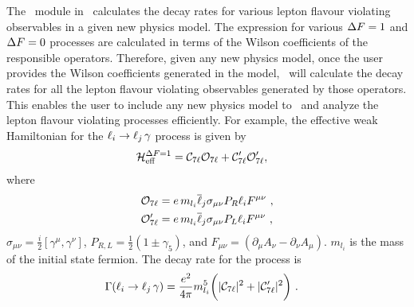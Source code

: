 \documentclass[preprint,3p,12pt]{elsarticle}
\begin{document}
The \lfv\ module in \hf\ calculates the decay rates for various lepton flavour violating observables in a given new physics model. The expression for various $\Delta F = 1$ and $\Delta F=0$ processes are calculated in terms of the Wilson coefficients of the responsible operators. Therefore, given any new physics model, once the user provides the Wilson coefficients generated in the model, \hf\ will calculate the decay rates for all the lepton flavour violating observables generated by those operators. This enables the user to include any new physics model to \hf\ and analyze the lepton flavour violating processes efficiently. For example, the effective weak Hamiltonian for the $\ell_i \to \ell_j\, \gamma$ process is given by
\begin{align}
\mathcal{H}_{\rm eff}^{\Delta F=1} &=  
\mathcal{C}_{7\ell} \mathcal{O}_{7\ell} + \mathcal{C}_{7\ell}^{\prime} \mathcal{O}_{7\ell}^{\prime} , \nonumber
\end{align}
where
\begin{align}
\mathcal{O}_{7\ell} &= e\, m_{l_i} 
\overline{\ell}_j \sigma_{\mu \nu} P_R \ell_i F^{\mu \nu}\ , \notag \\
\mathcal{O}_{7\ell}^{\prime} &= e\, m_{l_i} 
\overline{\ell}_j \sigma_{\mu \nu} P_L \ell_i F^{\mu \nu}\ , \nonumber
\end{align}
$\sigma_{\mu \nu} = \frac{i}{2}[\gamma^{\mu},\gamma^{\nu}]$, $P_{R,L} = \frac{1}{2} (1\pm\gamma_5)$, and $F_{\mu\nu} = (\partial_{\mu} A_{\nu} - \partial_{\nu} A_{\mu})$. $m_{l_i}$ is the mass of the initial state fermion. The decay rate for the process is
\begin{align}
\Gamma (\ell_i \to \ell_j\, \gamma) &= \frac{e^2}{4\pi} m_{l_i}^5 
\bigg(|\mathcal{C}_{7\ell}|^2 + |\mathcal{C}_{7\ell}^\prime|^2\bigg) \ . \nonumber
\end{align}
\end{document}
